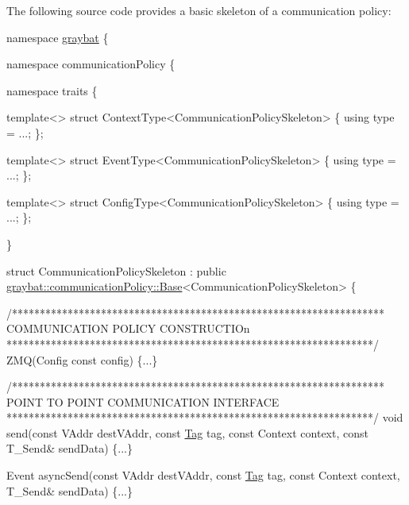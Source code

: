 The following source code provides a basic skeleton of a communication policy\+:


\begin{DoxyCode}
\textcolor{keyword}{namespace }\hyperlink{namespacegraybat}{graybat} \{

    \textcolor{keyword}{namespace }communicationPolicy \{

        \textcolor{keyword}{namespace }traits \{

            \textcolor{keyword}{template}<>
            \textcolor{keyword}{struct }ContextType<CommunicationPolicySkeleton> \{
                \textcolor{keyword}{using} type = ...;
            \};

            \textcolor{keyword}{template}<>
            \textcolor{keyword}{struct }EventType<CommunicationPolicySkeleton> \{
                \textcolor{keyword}{using} type = ...;
            \};

            \textcolor{keyword}{template}<>
            \textcolor{keyword}{struct }ConfigType<CommunicationPolicySkeleton> \{
                \textcolor{keyword}{using} type = ...;
            \};

        \}

        \textcolor{keyword}{struct }CommunicationPolicySkeleton : \textcolor{keyword}{public} 
      \hyperlink{structgraybat_1_1communicationPolicy_1_1Base}{graybat::communicationPolicy::Base}<CommunicationPolicySkeleton> \{


            \textcolor{comment}{/*******************************************************************}
\textcolor{comment}{               COMMUNICATION POLICY CONSTRUCTIOn}
\textcolor{comment}{             ******************************************************************/}
            ZMQ(Config \textcolor{keyword}{const} config) \{...\}


            \textcolor{comment}{/*******************************************************************}
\textcolor{comment}{               POINT TO POINT COMMUNICATION INTERFACE}
\textcolor{comment}{             ******************************************************************/}
            \textcolor{keywordtype}{void} send(\textcolor{keyword}{const} VAddr destVAddr, \textcolor{keyword}{const} \hyperlink{structTag}{Tag} tag, \textcolor{keyword}{const} Context context, \textcolor{keyword}{const} T\_Send& 
      sendData) \{...\}

            Event asyncSend(\textcolor{keyword}{const} VAddr destVAddr, \textcolor{keyword}{const} \hyperlink{structTag}{Tag} tag, \textcolor{keyword}{const} Context context, T\_Send& 
      sendData) \{...\}


\end{DoxyCode}

